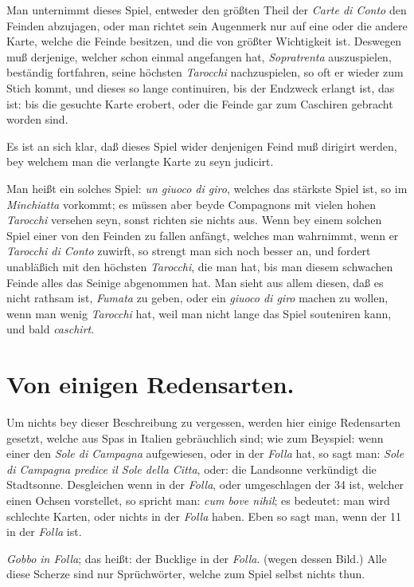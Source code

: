 \documentclass[11pt,a6paper,twoside]{article}
\begin{document}
Man unternimmt dieses Spiel, entweder den größten Theil der \textit{Carte di Conto} den Feinden abzujagen, oder man richtet sein Augenmerk nur auf eine oder die andere Karte, welche die Feinde besitzen, und die von größter Wichtigkeit ist. Deswegen muß derjenige, welcher schon einmal angefangen hat, \textit{Sopratrenta} auszuspielen, beständig fortfahren, seine höchsten \textit{Tarocchi} nachzuspielen, so oft er wieder zum Stich kommt, und dieses so lange continuiren, bis der Endzweck erlangt ist, das ist: bis die gesuchte Karte erobert, oder die Feinde gar zum Caschiren gebracht worden sind.

Es ist an sich klar, daß dieses Spiel wider denjenigen Feind muß dirigirt werden, bey welchem man die verlangte Karte zu seyn judicirt.

Man heißt ein solches Spiel: \textit{un giuoco di giro}, welches das stärkste Spiel ist, so im \textit{Minchiatta} vorkommt; es müssen aber beyde Compagnons mit vielen hohen \textit{Tarocchi} versehen seyn, sonst richten sie nichts aus. Wenn bey einem solchen Spiel einer von den Feinden zu fallen anfängt, welches man wahrnimmt, wenn er \textit{Tarocchi di Conto} zuwirft, so strengt man sich noch besser an, und fordert unabläßich mit den höchsten \textit{Tarocchi}, die man hat, bis man diesem schwachen Feinde alles das Seinige abgenommen hat. Man sieht aus allem diesen, daß es nicht rathsam ist, \textit{Fumata} zu geben, oder ein \textit{giuoco di giro} machen zu wollen, wenn man wenig \textit{Tarocchi} hat, weil man nicht lange das Spiel souteniren kann, und bald \textit{caschirt}.


\section{Von einigen Redensarten.}

Um nichts bey dieser Beschreibung zu vergessen, werden hier einige Redensarten gesetzt, welche aus Spas in Italien gebräuchlich sind; wie zum Beyspiel: wenn einer den \textit{Sole di Campagna} aufgewiesen, oder in der \textit{Folla} hat, so sagt man: \textit{Sole di Campagna predice il Sole della Citta}, oder: die Landsonne verkündigt die Stadtsonne. Desgleichen wenn in der \textit{Folla}, oder umgeschlagen der 34 ist, welcher einen Ochsen vorstellet, so spricht man: \textit{cum bove nihil}; es bedeutet: man wird schlechte Karten, oder nichts in der \textit{Folla} haben. Eben so sagt man, wenn der 11 in der \textit{Folla} ist.

\textit{Gobbo in Folla}; das heißt: der Bucklige in der \textit{Folla}. (wegen dessen Bild.) Alle diese Scherze sind nur Sprüchwörter, welche zum Spiel selbst nichts thun.
\end{document}
